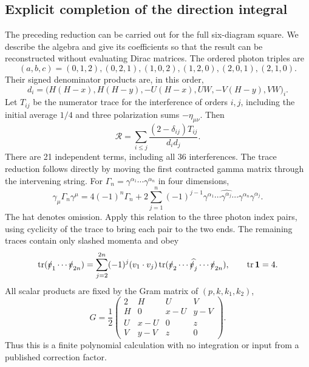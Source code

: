 \subsection{Explicit completion of the direction integral}
The preceding reduction can be carried out for the full six-diagram
square. We describe the algebra and give its coefficients so that
the result can be reconstructed without evaluating Dirac matrices.
The ordered photon triples are
\begin{equation}
 (a,b,c)=(0,1,2),(0,2,1),(1,0,2),(1,2,0),(2,0,1),(2,1,0).
\end{equation}
Their signed denominator products are, in this order,
\begin{equation}
 d_i=\bigl(H(H-x),H(H-y),-U(H-x),UW,-V(H-y),VW\bigr)_i.
\end{equation}
Let $T_{ij}$ be the numerator trace for the interference of
orders $i,j$, including the initial average $1/4$ and three
polarization sums $-\eta_{\mu\nu}$. Then
\begin{equation}
 \mathcal R=\sum_{i\leq j}\frac{(2-\delta_{ij})T_{ij}}{d_i d_j}.
\end{equation}
There are 21 independent terms, including all 36 interferences.
The trace reduction follows directly by moving the first contracted
gamma matrix through the intervening string. For
$\Gamma_n=\gamma^{\alpha_1}\cdots\gamma^{\alpha_n}$ in four dimensions,
\begin{equation}
 \gamma_\mu\Gamma_n\gamma^\mu
 =4(-1)^n\Gamma_n+
 2\sum_{j=1}^n(-1)^{j-1}
 \gamma^{\alpha_1}\cdots\widehat{\gamma^{\alpha_j}}\cdots
 \gamma^{\alpha_n}\gamma^{\alpha_j}.
\end{equation}
The hat denotes omission. Apply this relation to the three photon
index pairs, using cyclicity of the trace to bring each pair to
the two ends. The remaining traces contain only slashed momenta
and obey
\begin{equation}
 \operatorname{tr}(\slashed v_1\cdots\slashed v_{2n})
 =\sum_{j=2}^{2n}(-1)^j(v_1\cdot v_j)
 \operatorname{tr}(\slashed v_2\cdots
       \widehat{\slashed v_j}\cdots\slashed v_{2n}),
 \qquad \operatorname{tr}\mathbf1=4.
\end{equation}
All scalar products are fixed by the Gram matrix of $(p,k,k_1,k_2)$,
\begin{equation}
 G=\frac12\begin{pmatrix}
 2&H&U&V\\ H&0&x-U&y-V\\ U&x-U&0&z\\ V&y-V&z&0
 \end{pmatrix}.
\end{equation}
Thus this is a finite polynomial calculation with no integration
or input from a published correction factor.

